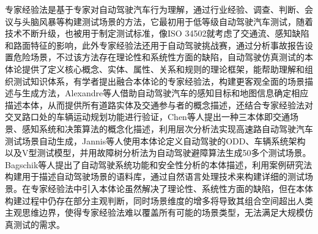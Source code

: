 专家经验法是基于专家对自动驾驶汽车行为理解，通过行业经验、调查、判断、会议与头脑风暴等构建测试场景的方法，它最初用于低等级自动驾驶汽车测试，随着技术不断升级，也被用于制定测试标准，像ISO 34502就考虑了交通流、感知缺陷和路面特征的影响，此外专家经验法还用于自动驾驶挑战赛，通过分析事故报告设置危险场景，不过该方法存在理论性和系统性方面的缺陷，自动驾驶仿真测试的本体论提供了定义核心概念、实体、属性、关系和规则的理论框架，能帮助理解和组织测试知识体系，有学者提出融合本体论的专家经验法，构建更客观全面的场景描述与生成方法，Alexandre等人借助自动驾驶汽车的感知目标和地图信息确定相应描述本体，从而提供所有道路实体及交通参与者的概念描述，还结合专家经验法对交叉路口处的车辆运动规划功能进行验证，Chen等人提出一种三本体即交通场景、感知系统和决策算法的概念化描述，利用层次分析法实现高速路自动驾驶汽车测试场景自动生成，Jannis等人使用本体论定义自动驾驶的ODD、车辆系统架构以及V型测试模型，并用故障树分析法为自动驾驶避障算法生成50多个测试场景。Bagschik等人提出了自动驾驶系统功能和安全性分析的本体描述，利用案例研究法构建用于描述自动驾驶场景的语料库，通过自然语言处理技术来构建详细的测试场景。在专家经验法中引入本体论虽然解决了理论性、系统性方面的缺陷，但在本体构建过程中仍存在部分主观判断，同时场景维度的增多将导致其组合空间超出人类主观思维边界，使得专家经验法难以覆盖所有可能的场景类型，无法满足大规模仿真测试的需求\cite{eigen2009problem}。


